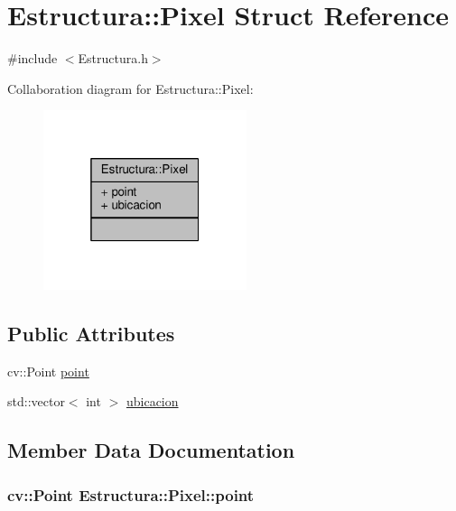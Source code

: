 \hypertarget{structEstructura_1_1Pixel}{}\section{Estructura\+:\+:Pixel Struct Reference}
\label{structEstructura_1_1Pixel}


{\ttfamily \#include $<$Estructura.\+h$>$}



Collaboration diagram for Estructura\+:\+:Pixel\+:
\nopagebreak
\begin{figure}[H]
\begin{center}
\leavevmode
\includegraphics[width=169pt]{structEstructura_1_1Pixel__coll__graph}
\end{center}
\end{figure}
\subsection*{Public Attributes}
\begin{DoxyCompactItemize}
\item 
cv\+::\+Point \hyperlink{structEstructura_1_1Pixel_af5a856559840e7f38fab3147aa576146}{point}
\item 
std\+::vector$<$ int $>$ \hyperlink{structEstructura_1_1Pixel_ac4b5e1358658d9f712933cb20a77d297}{ubicacion}
\end{DoxyCompactItemize}


\subsection{Member Data Documentation}
\subsubsection[{\texorpdfstring{point}{point}}]{\setlength{\rightskip}{0pt plus 5cm}cv\+::\+Point Estructura\+::\+Pixel\+::point}\hypertarget{structEstructura_1_1Pixel_af5a856559840e7f38fab3147aa576146}{}\label{structEstructura_1_1Pixel_af5a856559840e7f38fab3147aa576146}


